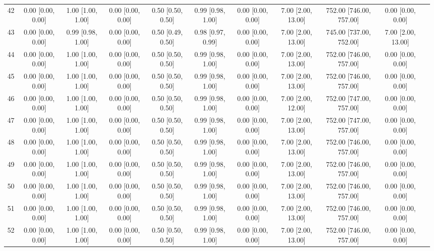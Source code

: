 \documentclass[8pt]{article}
\begin{document}
\begin{center}
\begin{footnotesize}
\begin{longtable}{|ccccccccccc|}
 42 &  0.00 [0.00, 0.00] &  1.00 [1.00, 1.00] &  0.00 [0.00, 0.00] &  0.50 [0.50, 0.50] &  0.99 [0.98, 1.00] &  0.00 [0.00, 0.00] &  7.00 [2.00, 13.00] &  752.00 [746.00, 757.00] &        0.00 [0.00, 0.00] \\
 43 &  0.00 [0.00, 0.00] &  0.99 [0.98, 1.00] &  0.00 [0.00, 0.00] &  0.50 [0.49, 0.50] &  0.98 [0.97, 0.99] &  0.00 [0.00, 0.00] &  7.00 [2.00, 13.00] &  745.00 [737.00, 752.00] &       7.00 [2.00, 13.00] \\
 44 &  0.00 [0.00, 0.00] &  1.00 [1.00, 1.00] &  0.00 [0.00, 0.00] &  0.50 [0.50, 0.50] &  0.99 [0.98, 1.00] &  0.00 [0.00, 0.00] &  7.00 [2.00, 13.00] &  752.00 [746.00, 757.00] &        0.00 [0.00, 0.00] \\
 45 &  0.00 [0.00, 0.00] &  1.00 [1.00, 1.00] &  0.00 [0.00, 0.00] &  0.50 [0.50, 0.50] &  0.99 [0.98, 1.00] &  0.00 [0.00, 0.00] &  7.00 [2.00, 13.00] &  752.00 [746.00, 757.00] &        0.00 [0.00, 0.00] \\
 46 &  0.00 [0.00, 0.00] &  1.00 [1.00, 1.00] &  0.00 [0.00, 0.00] &  0.50 [0.50, 0.50] &  0.99 [0.98, 1.00] &  0.00 [0.00, 0.00] &  7.00 [2.00, 12.00] &  752.00 [747.00, 757.00] &        0.00 [0.00, 0.00] \\
 47 &  0.00 [0.00, 0.00] &  1.00 [1.00, 1.00] &  0.00 [0.00, 0.00] &  0.50 [0.50, 0.50] &  0.99 [0.98, 1.00] &  0.00 [0.00, 0.00] &  7.00 [2.00, 13.00] &  752.00 [747.00, 757.00] &        0.00 [0.00, 0.00] \\
 48 &  0.00 [0.00, 0.00] &  1.00 [1.00, 1.00] &  0.00 [0.00, 0.00] &  0.50 [0.50, 0.50] &  0.99 [0.98, 1.00] &  0.00 [0.00, 0.00] &  7.00 [2.00, 13.00] &  752.00 [746.00, 757.00] &        0.00 [0.00, 0.00] \\
 49 &  0.00 [0.00, 0.00] &  1.00 [1.00, 1.00] &  0.00 [0.00, 0.00] &  0.50 [0.50, 0.50] &  0.99 [0.98, 1.00] &  0.00 [0.00, 0.00] &  7.00 [2.00, 13.00] &  752.00 [746.00, 757.00] &        0.00 [0.00, 0.00] \\
 50 &  0.00 [0.00, 0.00] &  1.00 [1.00, 1.00] &  0.00 [0.00, 0.00] &  0.50 [0.50, 0.50] &  0.99 [0.98, 1.00] &  0.00 [0.00, 0.00] &  7.00 [2.00, 13.00] &  752.00 [746.00, 757.00] &        0.00 [0.00, 0.00] \\
 51 &  0.00 [0.00, 0.00] &  1.00 [1.00, 1.00] &  0.00 [0.00, 0.00] &  0.50 [0.50, 0.50] &  0.99 [0.98, 1.00] &  0.00 [0.00, 0.00] &  7.00 [2.00, 13.00] &  752.00 [746.00, 757.00] &        0.00 [0.00, 0.00] \\
 52 &  0.00 [0.00, 0.00] &  1.00 [1.00, 1.00] &  0.00 [0.00, 0.00] &  0.50 [0.50, 0.50] &  0.99 [0.98, 1.00] &  0.00 [0.00, 0.00] &  7.00 [2.00, 13.00] &  752.00 [746.00, 757.00] &        0.00 [0.00, 0.00] \\

\end{longtable}
\end{footnotesize}
\end{center}
\end{document}
